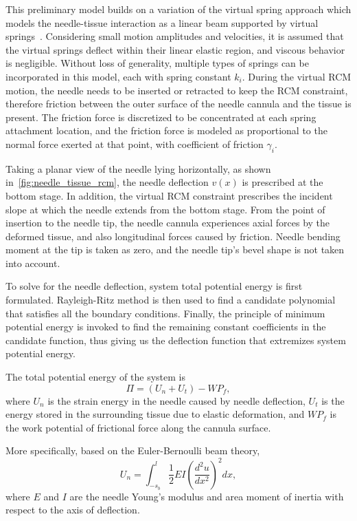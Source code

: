 This preliminary model builds on a variation of the virtual spring approach which models the needle-tissue interaction as a linear beam supported by virtual springs~\parencite{glozmanImageGuidedRoboticFlexible2007,lehmannDeflectionModelingNeedle2017}. Considering small motion amplitudes and velocities, it is assumed that the virtual springs deflect within their linear elastic region, and viscous behavior is negligible. Without loss of generality, multiple types of springs can be incorporated in this model, each with spring constant $k_i$.
During the virtual RCM motion, the needle needs to be inserted or retracted to keep the RCM constraint, therefore friction between the outer surface of the needle cannula and the tissue is present. The friction force is discretized to be concentrated at each spring attachment location, and the friction force is modeled as proportional to the normal force exerted at that point, with coefficient of friction $\gamma_i$.

Taking a planar view of the needle lying horizontally, as shown in~\cref{fig:needle_tissue_rcm}, the needle deflection $v(x)$ is prescribed at the bottom stage. In addition, the virtual RCM constraint prescribes the incident slope at which the needle extends from the bottom stage. From the point of insertion to the needle tip, the needle cannula experiences axial forces by the deformed tissue, and also longitudinal forces caused by friction. Needle bending moment at the tip is taken as zero, and the needle tip's bevel shape is not taken into account.

To solve for the needle deflection, system total potential energy is first formulated. Rayleigh-Ritz method is then used to find a candidate polynomial that satisfies all the boundary conditions. Finally, the principle of minimum potential energy is invoked to find the remaining constant coefficients in the candidate function, thus giving us the deflection function that extremizes system potential energy. 

The total potential energy of the system is
\begin{equation}
  \Pi = (U_n + U_t) - WP_f,
\end{equation}
where $U_n$ is the strain energy in the needle caused by needle deflection, $U_t$ is the energy stored in the surrounding tissue due to elastic deformation, and $WP_f$ is the work potential of frictional force along the cannula surface.

More specifically, based on the Euler-Bernoulli beam theory,
\begin{equation}
  U_n = \int_{-s_b}^l{\frac{1}{2} EI \left(\frac{d^2u}{dx^2}\right)^2} dx,
\end{equation}
where $E$ and $I$ are the needle Young's modulus and area moment of inertia with respect to the axis of deflection.

